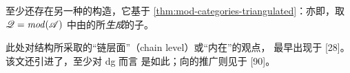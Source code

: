 \begin{remark}\label{thm:alternative-envelope-yoneda}
至少还存在另一种\trCanonical{}的\trTriangulated\trEnvelope{}构造，它基于%
\cref{thm:mod-categories-triangulated}：亦即，取 $\mathscr{Q}=\mathit{mod}(\mathscr{A})$
中由\trYonedaEmbedding{}的\trImage{}所\emph{生成}的\trFull{}子\trCategory。
\end{remark}

\begin{remark}\label{thm:chain-level-viewpoint-history}
此处对\trTriangulated{}结构所采取的“链层面”（chain level）或“内在”的观点，
最早出现于 [28]。该文还引进了\trTwistedComplex，至少对 dg \trCategory{}而言
是如此；向\trACategory{}的推广则见于 [90]。
\end{remark}

